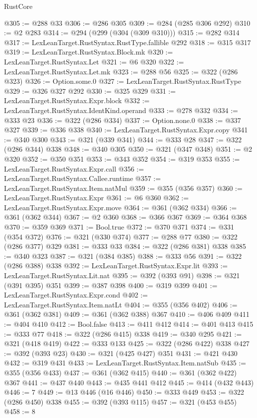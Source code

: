 \begin{lexlean}{RustCore}
\begin{coremodule}
@305 := @288 @33
@306 := @286 @305
@309 := @284 (@285 @306 @292)
@310 := @2 @283
@314 := @294 (@299 (@304 (@309 @310)))
@315 := @282 @314
@317 := LexLeanTarget.RustSyntax.RustType.fallible @292
@318 := @315 @317
@319 := LexLeanTarget.RustSyntax.Block.mk
@320 := LexLeanTarget.RustSyntax.Let
@321 := @6 @320
@322 := LexLeanTarget.RustSyntax.Let.mk
@323 := @288 @56
@325 := @322 (@286 @323)
@326 := Option.some.{0}
@327 := LexLeanTarget.RustSyntax.RustType
@329 := @326 @327 @292
@330 := @325 @329
@331 := LexLeanTarget.RustSyntax.Expr.block
@332 := LexLeanTarget.RustSyntax.IdentKind.operand
@333 := @278 @332
@334 := @333 @23
@336 := @322 (@286 @334)
@337 := Option.none.{0}
@338 := @337 @327
@339 := @336 @338
@340 := LexLeanTarget.RustSyntax.Expr.copy
@341 := @340 @300
@343 := @321 (@339 @341)
@344 := @333 @28
@347 := @322 (@286 @344) @338
@348 := @340 @305
@350 := @321 (@347 @348)
@351 := @2 @320
@352 := @350 @351
@353 := @343 @352
@354 := @319 @353
@355 := LexLeanTarget.RustSyntax.Expr.call
@356 := LexLeanTarget.RustSyntax.Callee.runtime
@357 := LexLeanTarget.RustSyntax.Item.natMul
@359 := @355 (@356 @357)
@360 := LexLeanTarget.RustSyntax.Expr
@361 := @6 @360
@362 := LexLeanTarget.RustSyntax.Expr.move
@364 := @361 (@362 @334)
@366 := @361 (@362 @344)
@367 := @2 @360
@368 := @366 @367
@369 := @364 @368
@370 := @359 @369
@371 := Bool.true
@372 := @370 @371
@374 := @331 (@354 @372)
@376 := @321 (@330 @374)
@377 := @288 @77
@380 := @322 (@286 @377) @329
@381 := @333 @33
@384 := @322 (@286 @381) @338
@385 := @340 @323
@387 := @321 (@384 @385)
@388 := @333 @56
@391 := @322 (@286 @388) @338
@392 := LexLeanTarget.RustSyntax.Expr.lit
@393 := LexLeanTarget.RustSyntax.Lit.nat
@395 := @392 (@393 @91)
@398 := @321 (@391 @395) @351
@399 := @387 @398
@400 := @319 @399
@401 := LexLeanTarget.RustSyntax.Expr.cond
@402 := LexLeanTarget.RustSyntax.Item.natLt
@404 := @355 (@356 @402)
@406 := @361 (@362 @381)
@409 := @361 (@362 @388) @367
@410 := @406 @409
@411 := @404 @410
@412 := Bool.false
@413 := @411 @412
@414 := @401 @413
@415 := @333 @77
@418 := @322 (@286 @415) @338
@419 := @340 @295
@421 := @321 (@418 @419)
@422 := @333 @133
@425 := @322 (@286 @422) @338
@427 := @392 (@393 @23)
@430 := @321 (@425 @427) @351
@431 := @421 @430
@432 := @319 @431
@433 := LexLeanTarget.RustSyntax.Item.natSub
@435 := @355 (@356 @433)
@437 := @361 (@362 @415)
@440 := @361 (@362 @422) @367
@441 := @437 @440
@443 := @435 @441 @412
@445 := @414 (@432 @443)
@446 := 7
@449 := @13 @446 (@16 @446)
@450 := @333 @449
@453 := @322 (@286 @450) @338
@455 := @392 (@393 @115)
@457 := @321 (@453 @455)
@458 := 8

\end{coremodule}
\end{lexlean}
